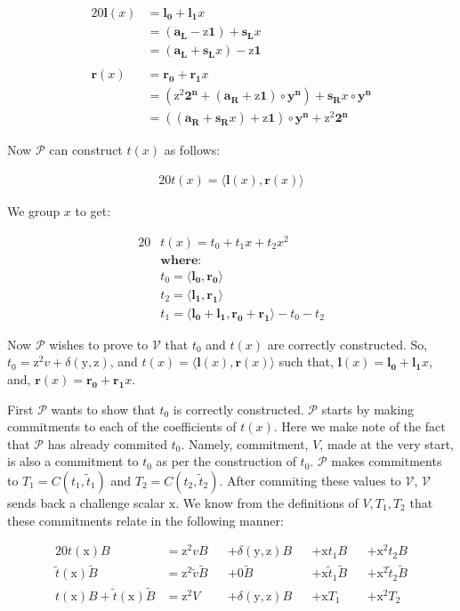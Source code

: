 \documentclass{article}
\newcommand{\eq}[1]{\begin{alignat*}{20}#1\end{alignat*}}
\renewcommand{\vec}[1]{\boldsymbol{#1}}
\newcommand{\ran}[1]{\mathrm{#1}}
\newcommand{\vecran}[1]{\mathbf{#1}}
\newcommand{\V}{\mathcal{V}}
\renewcommand{\P}{\mathcal{P}}
\newcommand{\tB}{\widetilde{B}}
\renewcommand{\tt}{\widetilde{t}}
\newcommand{\tv}{\widetilde{v}}
\newcommand{\dotp}[2]{\langle #1, #2 \rangle}
\newcommand{\opn}[1]{\operatorname{#1}}
\newcommand{\vecl}[1]{\vec{#1_{\opn{L}}}}
\newcommand{\vecr}[1]{\vec{#1_{\opn{R}}}}
\begin{document}
\eq{
	\vec{l}(x) &= \vec{l_0} + \vec{l_1}x \\ &= (\vecl{a} - \ran{z}\vec{1}) + \vecl{s}x \\ &= (\vecl{a} + \vecl{s}x) - \ran{z}\vec{1}\\&\\
	\vec{r}(x) &= \vec{r_0} + \vec{r_1}x \\ &= (\ran{z^2}\vec{2^n} + (\vecr{a} + \ran{z}\vec{1})\circ\vecran{y^n}) + \vecr{s}x\circ\vecran{y^n} \\ &= ((\vecr{a} + \vecr{s}x) + \ran{z}\vec{1}) \circ \vecran{y^n} + \ran{z}^2\vec{2^n}
}

Now $\P$ can construct $t(x)$ as follows:

\eq{
	t(x) = \dotp{\vec{l}(x)}{\vec{r}(x)}
}

We group $x$ to get:

\eq{
	&t(x) = t_0 + t_1x + t_2x^2 \\
	&\textbf{where:} \\
	&t_0 = \dotp{\vec{l_0}}{\vec{r_0}}\\
	&t_2 = \dotp{\vec{l_1}}{\vec{r_1}}\\
	&t_1 = \dotp{\vec{l_0}+\vec{l_1}}{\vec{r_0} + \vec{r_1}} - t_0 - t_2
}

Now $\P$ wishes to prove to $\V$ that $t_0$ and $t(x)$ are correctly
constructed. So, $t_0 = \ran{z^2}v + \delta(\ran{y},\ran{z})$, and $t(x)
= \dotp{\vec{l}(x)}{\vec{r}(x)}$ such that, $\vec{l}(x) = \vec{l_0}
+ \vec{l_1}x$, and, $\vec{r}(x) = \vec{r_0} + \vec{r_1}x$.

First $\P$ wants to show that $t_0$ is correctly constructed. $\P$
starts by making commitments to each of the coefficients of $t(x)$. Here
we make note of the fact that $\P$ has already commited $t_0$. Namely,
commitment, $V$, made at the very start, is also a commitment to $t_0$
as per the construction of $t_0$. $\P$ makes commitments to $T_1 =
C(t_1, \tt_1)$ and $T_2 = C(t_2, \tt_2)$. After commiting these values
to $\V$, $\V$ sends back a challenge scalar $\ran{x}$. We know from
the definitions of $V, T_1, T_2$ that these commitments relate in the
following manner:

\eq{
	t(\ran{x})B                   &= \ran{z^2}vB      &&+ \delta(\ran{y},\ran{z})B &&+ \ran{x}t_1B       &&+ \ran{x^2}t_2B \\
	\tt(\ran{x})\tB               &= \ran{z^2}\tv \tB &&+ 0\tB                     &&+ \ran{x} \tt_1 \tB &&+ \ran{x^2} \tt_2 \tB\\
	t(\ran{x})B + \tt(\ran{x})\tB &= \ran{z^2}V       &&+ \delta(\ran{y},\ran{z})B &&+ \ran{x}T_1        &&+ \ran{x^2}T_2
}
\end{document}
